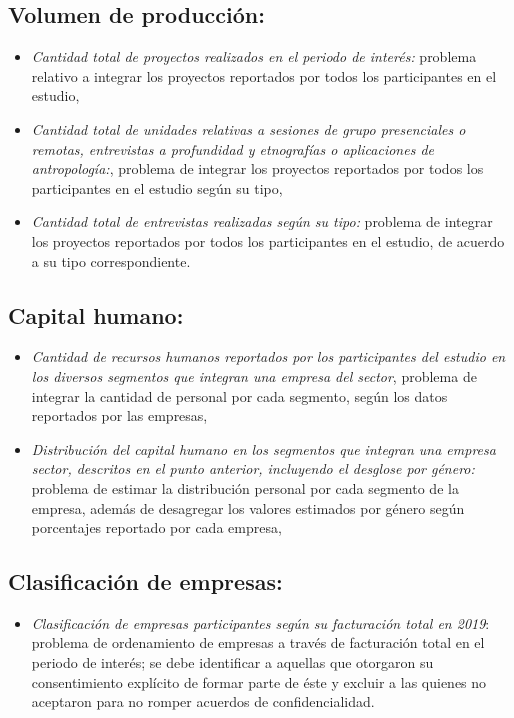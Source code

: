 \subsection{Volumen de producción:}
\begin{itemize}
\item \textit{Cantidad total de proyectos realizados en el periodo de interés:} problema relativo a integrar los proyectos reportados por todos los participantes en el estudio,
\item \textit{Cantidad total de unidades relativas a sesiones de grupo presenciales o remotas, entrevistas a profundidad y etnografías o aplicaciones de antropología:}, problema de integrar los proyectos reportados por todos los participantes en el estudio según su tipo,
\item \textit{Cantidad total de entrevistas realizadas según su tipo:} problema de integrar los proyectos reportados por todos los participantes en el estudio, de acuerdo a su tipo correspondiente.
\end{itemize}

\subsection{Capital humano:}
\begin{itemize}
\item \textit{Cantidad de recursos humanos reportados por los participantes del estudio en los diversos segmentos que integran una empresa del sector}, problema de integrar la cantidad de personal por cada segmento, según los datos reportados por las empresas,
\item \textit{Distribución del capital humano en los segmentos que integran una empresa sector, descritos en el punto anterior, incluyendo el desglose por género:} problema de estimar la distribución personal por cada segmento de la empresa, además de desagregar los valores estimados por género según porcentajes reportado por cada empresa,
\end{itemize}

\subsection{Clasificación de empresas:}
\begin{itemize}
\item \textit{Clasificación de empresas participantes según su facturación total en 2019}: problema de ordenamiento de empresas a través de facturación total en el periodo de interés; se debe identificar  a aquellas que otorgaron su consentimiento explícito de formar parte de éste y excluir a las quienes no aceptaron para no romper acuerdos de confidencialidad.
\end{itemize}

